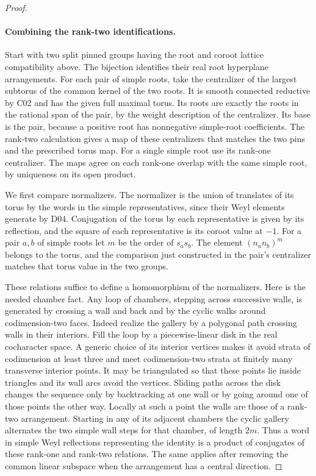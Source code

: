 \documentclass[11pt,a4paper,openany,oneside]{book}
\theoremstyle{resultstyle}
\theoremstyle{definition}
\numberwithin{equation}{chapter}
\begin{document}
\begin{proof}
\paragraph{Combining the rank-two identifications.}
Start with two split pinned groups having the root and
coroot lattice compatibility above. The bijection identifies
their real root hyperplane arrangements. For each pair of
simple roots, take the centralizer of the largest subtorus
of the common kernel of the two roots. It is smooth connected
reductive by C02 and has the given full maximal torus.
Its roots are exactly the roots in the rational span of the
pair, by the weight description of the centralizer. Its
base is the pair, because a positive root has nonnegative
simple-root coefficients. The rank-two calculation gives a
map of these centralizers that matches the two pins and the
prescribed torus map. For a single simple root use its
rank-one centralizer. The maps agree on each rank-one overlap
with the same simple root, by uniqueness on its open product.

We first compare normalizers. The normalizer is the union
of translates of its torus by the words in the simple
representatives, since their Weyl elements generate by
D04. Conjugation of the torus by each representative is
given by its reflection, and the square of each representative
is its coroot value at \(-1\). For a pair \(a,b\) of simple
roots let \(m\) be the order of \(s_as_b\). The element
\((n_an_b)^m\) belongs to the torus, and the comparison
just constructed in the pair's centralizer matches that
torus value in the two groups.

These relations suffice to define a homomorphism of the
normalizers. Here is the needed chamber fact. Any loop of
chambers, stepping across successive walls, is generated by
crossing a wall and back and by the cyclic walks around
codimension-two faces. Indeed realize the gallery by a
polygonal path crossing walls in their interiors. Fill the
loop by a piecewise-linear disk in the real cocharacter
space. A generic choice of its interior vertices makes
it avoid strata of codimension at least three and meet
codimension-two strata at finitely many transverse interior
points. It may be triangulated so that these points lie
inside triangles and its wall arcs avoid the vertices.
Sliding paths across the disk changes the sequence only by
backtracking at one wall or by going around one of those
points the other way. Locally at such a point the walls
are those of a rank-two arrangement. Starting in any
of its adjacent chambers the cyclic gallery alternates
the two simple wall steps for that chamber, of length
\(2m\). Thus a word in simple Weyl reflections
representing the identity is a product of conjugates of
these rank-one and rank-two relations. The same applies
after removing the common linear subspace when the
arrangement has a central direction.


\end{proof}
\end{document}
